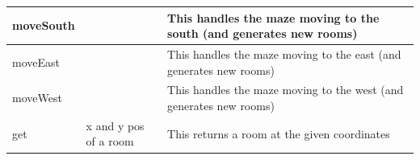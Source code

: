 \documentclass{article}
\begin{document}
\begin{center}
\begin{tabular}{ | m{} | m{}| m{} | }
                        moveSouth & & This handles the maze moving to the south (and generates new rooms)\\
                        \hline
                        moveEast & & This handles the maze moving to the east (and generates new rooms) \\
                        \hline
                        moveWest & & This handles the maze moving to the west (and generates new rooms)\\
                        \hline
                        get & x and y pos of a room & This returns a room at the given coordinates \\
                        \hline
                    \end{tabular}
                \end{center}
            \clearpage
\end{document}
